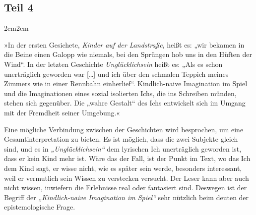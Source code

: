 \documentclass[12pt,a4paper]{article}
\newenvironment{longquote}
{%
    \vspace{-1.5em}
    \begin{adjustwidth}{2cm}{2cm}
        \fontsize{10}{12}\selectfont
        \singlespacing
        \itshape
    }
{%
    \end{adjustwidth}
}
\begin{document}
\subsection{Teil 4}
\begin{longquote}
»In der ersten Gesichete, \textit{Kinder auf der Landstraße}, heißt es: „wir bekamen in die Beine einen Galopp wie niemals, bei den Sprüngen hob uns in den Hüften der Wind“. In der letzten Geschichte \textit{Unglücklichsein} heißt es: „Als es schon unerträglich geworden war […] und ich über den schmalen Teppich meines Zimmers wie in einer Rennbahn einherlief“. Kindlich-naive Imagination im Spiel und die Imaginationen eines sozial isolierten Ichs, die ins Schreiben münden, stehen sich gegenüber. Die „wahre Gestalt“ des Ichs entwickelt sich im Umgang mit der Fremdheit seiner Umgebung.«\autocite[103]{fromm}
\end{longquote}

Eine mögliche Verbindung zwischen der Geschichten wird besprochen, um eine Gesamtinterpretation zu bieten. Es ist möglich, dass die zwei Subjekte gleich sind, und es in \textit{„Unglücklichsein“} dem lyrischen Ich unerträglich geworden ist, dass er kein Kind mehr ist. Wäre das der Fall, ist der Punkt im Text, wo das Ich dem Kind sagt, er wisse nicht, wie es später sein werde, besonders interessant, weil er vermutlich sein Wissen zu verstecken versucht. Der Leser kann aber auch nicht wissen, inwiefern die Erlebnisse real oder fantasiert sind. Deswegen ist der Begriff der \textit{„Kindlich-naive Imagination im Spiel“} sehr nützlich beim deuten der epistemologische Frage.

\clearpage
\printbibliography[
    title={Literaturverzeichnis}
]
\end{document}
